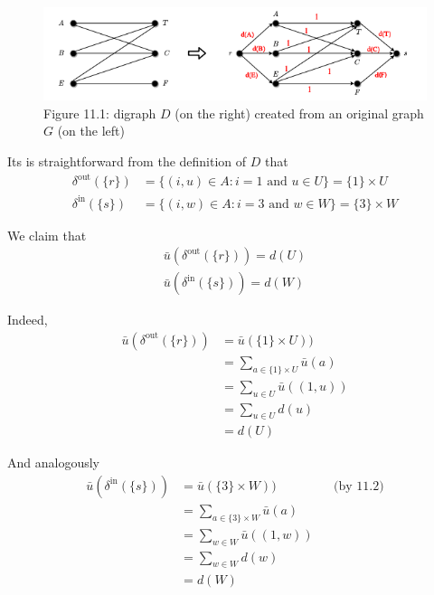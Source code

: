 \documentclass[a4paper,10pt, leqno]{article}
\theoremstyle{definition}
\begin{document}
\begin{figure}[ht]
\centering
  \includegraphics[width=40em]{digraph_deg.png}
  \captionsetup{labelformat=empty}
  \caption{Figure 11.1: digraph $D$ (on the right) created from an original graph $G$ (on the left)}
\end{figure}
Its is straightforward from the definition of $D$ that
\begin{align*}
\tag{11.1}
  \delta^\text{out}(\{r\}) &= \{(i, u) \in A : i = 1 \text{ and } u \in U\} = \{1\}\times U\\
  \tag{11.2}
  \delta^\text{in}(\{s\}) &= \{(i, w) \in A : i = 3 \text{ and } w \in W\} = \{3\}\times W
\end{align*}

We claim that
 \begin{align}
 \tag{11.3}
 \bar{u}(\delta^\text{out}(\{r\})) = d(U) \\
 \tag{11.4}
 \bar{u}(\delta^\text{in}(\{s\})) = d(W)
\end{align}


Indeed,
\begin{equation*}
\begin{aligned}
    \bar{u}(\delta^\text{out}(\{r\})) 
    &= \bar{u}(\{1\}\times U)) \\
    &= \sum_{a \in \{1\}\times U}{\bar{u}(a)} \\
    &= \sum_{u \in U}{\bar{u}((1, u))} \\
    &= \sum_{u \in U}{d(u)} \\
    &= d(U)
\end{aligned}
\end{equation*}

And analogously
\begin{equation*}
    \begin{aligned}
    \bar{u}(\delta^\text{in}(\{s\})) 
    &= \bar{u}(\{3\}\times W))  &&\text{(by 11.2)}\\
    &= \sum_{a \in \{3\}\times W}{\bar{u}(a)} \\
    &= \sum_{w \in W}{\bar{u}((1, w))} \\
    &= \sum_{w \in W}{d(w)} \\
    &= d(W)
    \end{aligned}
\end{equation*}
\end{document}
